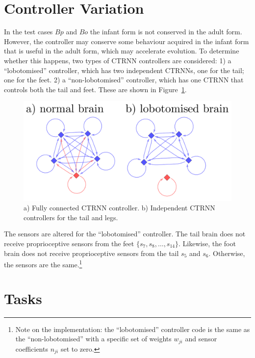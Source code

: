 \section{Controller Variation}

In the test cases $Bp$ and $Bo$ the infant form is not conserved in
the adult form.  However, the controller may conserve some behaviour
acquired in the infant form that is useful in the adult form, which
may accelerate evolution.  To determine whether this happens, two
types of CTRNN controllers are considered: 1) a ``lobotomised''
controller, which has two independent CTRNNs, one for the tail; one
for the feet. 2) a ``non-lobotomised'' controller, which has one CTRNN
that controls both the tail and feet.  These are shown in
Figure~\ref{ctrnn-figures}.

\begin{figure}[h]
  \centering
  \includegraphics[width=5in]{fig/ctrnn-figures.pdf}
  \vspace{-15pt}
  \caption[Variation of CTRNN controllers]{\label{ctrnn-figures}a)
    Fully connected CTRNN controller. b) Independent CTRNN controllers
    for the tail and legs.}
\end{figure}

The sensors are altered for the ``lobotomised'' controller.  The tail
brain does not receive proprioceptive sensors from the feet $\{s_7,
s_8, \ldots, s_14\}$.  Likewise, the foot brain does not receive
proprioceptive sensors from the tail $s_5$ and $s_6$.  Otherwise, the
sensors are the same.\footnote{Note on the implementation: the
  ``lobotomised'' controller code is the same as the
  ``non-lobotomised'' with a specific set of weights $w_{ji}$ and
  sensor coefficients $n_{ji}$ set to zero.}

\section{Tasks}

